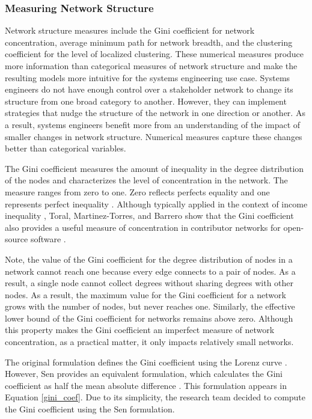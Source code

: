 \subsubsection{Measuring Network Structure}
\label{network_structure}

Network structure measures include the Gini coefficient for network concentration, average minimum path for network breadth, and the clustering coefficient for the level of localized clustering. These numerical measures produce more information than categorical measures of network structure and make the resulting models more intuitive for the systems engineering use case. Systems engineers do not have enough control over a stakeholder network to change its structure from one broad category to another. However, they can implement strategies that nudge the structure of the network in one direction or another. As a result, systems engineers benefit more from an understanding of the impact of smaller changes in network structure. Numerical measures capture these changes better than categorical variables.

The Gini coefficient measures the amount of inequality in the degree distribution of the nodes and characterizes the level of concentration in the network. The measure ranges from zero to one. Zero reflects perfects equality and one represents perfect inequality \cite{gini}. Although typically applied in the context of income inequality \cite{gini2, yitzhaki}, Toral, Martinez-Torres, and Barrero show that the Gini coefficient also provides a useful measure of concentration in contributor networks for open-source software \cite{toral} . 

Note, the value of the Gini coefficient for the degree distribution of nodes in a network cannot reach one because every edge connects to a pair of nodes. As a result, a single node cannot collect degrees without sharing degrees with other nodes. As a result, the maximum value for the Gini coefficient for a network grows with the number of nodes, but never reaches one. Similarly, the effective lower bound of the Gini coefficient for networks remains above zero. Although this property makes the Gini coefficient an imperfect measure of network concentration, as a practical matter, it only impacts relatively small networks.

The original formulation defines the Gini coefficient using the Lorenz curve \cite{gini}. However, Sen provides an equivalent formulation, which calculates the Gini coefficient as half the mean absolute difference \cite{sen}. This formulation appears in Equation \ref{gini_coef}. Due to its simplicity, the research team decided to compute the Gini coefficient using the Sen formulation.

